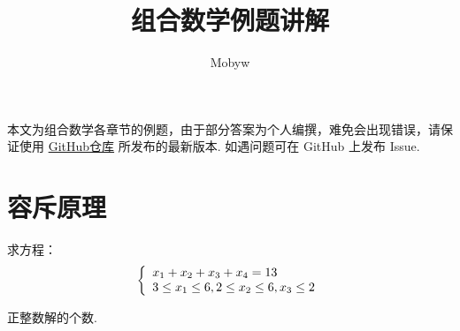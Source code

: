 \documentclass[cn, hazy, blue, normal, 12pt]{elegantnote}
\title{组合数学例题讲解}
\author{Mobyw}
\date{\zhtoday}
\begin{document}
\maketitle



本文为组合数学各章节的例题，由于部分答案为个人编撰，难免会出现错误，请保证使用 \href{https://github.com/mobyw/MasterCourseNotes/blob/master/CombinatorialMathematics/CombinatorialMathematicsExamples.pdf}{GitHub仓库} 所发布的最新版本. 如遇问题可在 GitHub 上发布 Issue.


\section{容斥原理}

\begin{exercise}

    求方程：
    \begin{equation}
        \notag
        \left\{\begin{array}{l}
            x_{1}+x_{2}+x_{3}+x_{4}=13 \\
            3 \leq x_{1} \leq 6, 2 \leq x_{2} \leq 6, x_{3} \leq 2
        \end{array}\right.
    \end{equation}

    正整数解的个数.

\end{exercise}
\end{document}
